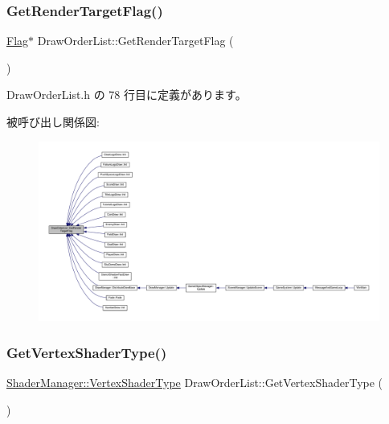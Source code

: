 \subsubsection{\texorpdfstring{Get\+Render\+Target\+Flag()}{GetRenderTargetFlag()}}
{\footnotesize\ttfamily \mbox{\hyperlink{class_flag}{Flag}}$\ast$ Draw\+Order\+List\+::\+Get\+Render\+Target\+Flag (\begin{DoxyParamCaption}{ }\end{DoxyParamCaption})\hspace{0.3cm}{\ttfamily [inline]}}



 Draw\+Order\+List.\+h の 78 行目に定義があります。

被呼び出し関係図\+:
\nopagebreak
\begin{figure}[H]
\begin{center}
\leavevmode
\includegraphics[width=350pt]{class_draw_order_list_aff90f57ce3ff0e2d7cd715267bfe024f_icgraph}
\end{center}
\end{figure}
\mbox{\label{class_draw_order_list_a6533ffbf1cd3f27583e0de8a08648b75}} 
\subsubsection{\texorpdfstring{Get\+Vertex\+Shader\+Type()}{GetVertexShaderType()}}
{\footnotesize\ttfamily \mbox{\hyperlink{class_shader_manager_a9b51e49d70eb3cc58f6d1f3994e8cfbd}{Shader\+Manager\+::\+Vertex\+Shader\+Type}} Draw\+Order\+List\+::\+Get\+Vertex\+Shader\+Type (\begin{DoxyParamCaption}{ }\end{DoxyParamCaption})\hspace{0.3cm}{\ttfamily [inline]}}



